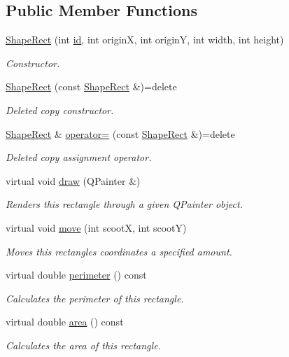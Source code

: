 \subsection*{Public Member Functions}
\begin{DoxyCompactItemize}
\item 
\mbox{\hyperlink{class_shape_rect_a0bbdbe7e4f7a9d91e7edff7796762e3e}{Shape\+Rect}} (int \mbox{\hyperlink{class_i_shape_a6ff2d631831c1079b88eeebc8ac65bb0}{id}}, int originX, int originY, int width, int height)
\begin{DoxyCompactList}\small\item\em Constructor. \end{DoxyCompactList}\item 
\mbox{\hyperlink{class_shape_rect_a5e2f220e75b55cb9c0405c4820f679f6}{Shape\+Rect}} (const \mbox{\hyperlink{class_shape_rect}{Shape\+Rect}} \&)=delete
\begin{DoxyCompactList}\small\item\em Deleted copy constructor. \end{DoxyCompactList}\item 
\mbox{\hyperlink{class_shape_rect}{Shape\+Rect}} \& \mbox{\hyperlink{class_shape_rect_aa5fd1e13562412ebceb977be0a455b18}{operator=}} (const \mbox{\hyperlink{class_shape_rect}{Shape\+Rect}} \&)=delete
\begin{DoxyCompactList}\small\item\em Deleted copy assignment operator. \end{DoxyCompactList}\item 
virtual void \mbox{\hyperlink{class_shape_rect_acc35ed70d85acd941b56cc505b9fae6c}{draw}} (Q\+Painter \&)
\begin{DoxyCompactList}\small\item\em Renders this rectangle through a given Q\+Painter object. \end{DoxyCompactList}\item 
virtual void \mbox{\hyperlink{class_shape_rect_a79fcc5998d54d1bfd851646479804b32}{move}} (int scootX, int scootY)
\begin{DoxyCompactList}\small\item\em Moves this rectangle\textquotesingle{}s coordinates a specified amount. \end{DoxyCompactList}\item 
virtual double \mbox{\hyperlink{class_shape_rect_a7dba46671dfd64188b37bff161d3bb89}{perimeter}} () const
\begin{DoxyCompactList}\small\item\em Calculates the perimeter of this rectangle. \end{DoxyCompactList}\item 
virtual double \mbox{\hyperlink{class_shape_rect_a87e891eaa6975fc73f4148427076812e}{area}} () const
\begin{DoxyCompactList}\small\item\em Calculates the area of this rectangle. \end{DoxyCompactList}\end{DoxyCompactItemize}
